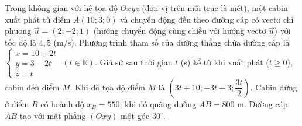 \begin{ex}
Trong không gian với hệ tọa độ $Oxyz$ (đơn vị trên mỗi trục là mét), một cabin xuất phát từ điểm $A(10;3;0)$ và chuyển động đều theo đường cáp có vectơ chỉ phương $\vec u=(2;-2;1)$ (hướng chuyển động cùng chiều với hướng vectơ $\vec u$) với tốc độ là $4{,}5$ (m/s).
\choiceTF
{\True Phương trình tham số của đường thẳng chứa đường cáp là $\begin{cases}x=10+2t\\y=3-2t\\z=t\end{cases}$ $(t\in\mathbb R)$.}
{\True Giả sử sau thời gian $t$ (s) kể từ khi xuất phát ($t\ge0$), cabin đến điểm $M$. Khi đó tọa độ điểm $M$ là $\left(3t+10;-3t+3;\dfrac{3t}{2}\right)$.}
{Cabin dừng ở điểm $B$ có hoành độ $x_B=550$, khi đó quãng đường $AB=800$ m.}
{Đường cáp $AB$ tạo với mặt phẳng $(Oxy)$ một góc $30^\circ$.}
\end{ex}
